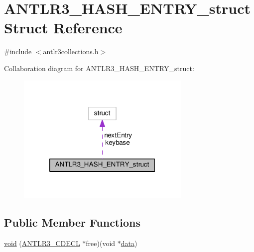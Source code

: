 \hypertarget{struct_a_n_t_l_r3___h_a_s_h___e_n_t_r_y__struct}{\section{A\-N\-T\-L\-R3\-\_\-\-H\-A\-S\-H\-\_\-\-E\-N\-T\-R\-Y\-\_\-struct Struct Reference}
\label{struct_a_n_t_l_r3___h_a_s_h___e_n_t_r_y__struct}
}


{\ttfamily \#include $<$antlr3collections.\-h$>$}



Collaboration diagram for A\-N\-T\-L\-R3\-\_\-\-H\-A\-S\-H\-\_\-\-E\-N\-T\-R\-Y\-\_\-struct\-:
\nopagebreak
\begin{figure}[H]
\begin{center}
\leavevmode
\includegraphics[width=236pt]{struct_a_n_t_l_r3___h_a_s_h___e_n_t_r_y__struct__coll__graph}
\end{center}
\end{figure}
\subsection*{Public Member Functions}
\begin{DoxyCompactItemize}
\item 
\hyperlink{struct_a_n_t_l_r3___h_a_s_h___e_n_t_r_y__struct_afadbac81f409738376f4bc88a9d0a154}{void} (\hyperlink{antlr3defs_8h_a91c919dd260a95cc88a0cd9b5c0a11cc}{A\-N\-T\-L\-R3\-\_\-\-C\-D\-E\-C\-L} $\ast$free)(void $\ast$\hyperlink{struct_a_n_t_l_r3___h_a_s_h___e_n_t_r_y__struct_afc2e60867f757681c1d0c32582c0a4e5}{data})
\end{DoxyCompactItemize}
